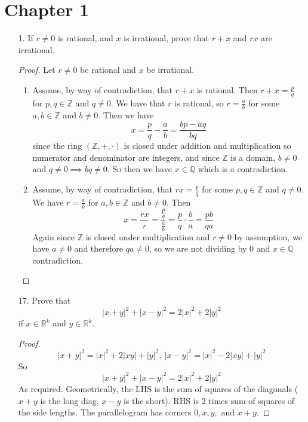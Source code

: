 \documentclass[hidelinks,12pt]{article}
\title{\scalebox{2}{Math 724 Homework 1}}
\author{\scalebox{1.5}{Theo Koss}}
\date{September 2024}
\newcommand{\R}{\mathbb{R}}
\newcommand{\Z}{\mathbb{Z}}
\newcommand{\Q}{\mathbb{Q}}
\begin{document}
\maketitle
\section{Chapter 1}
\begin{enumerate}
    \item[1.] If $r\neq0$ is rational, and $x$ is irrational, prove that $r+x$ and $rx$ are irrational.
        \begin{proof}
            Let $r\neq0$ be rational and $x$ be irrational.
            \begin{enumerate}[label=(\alph*)]
                \item Assume, by way of contradiction, that $r+x$ is rational. Then $r+x=\frac{p}{q}$ for $p,q\in\Z$ and $q\neq0$. We have that $r$ is rational, so $r=\frac{a}{b}$ for some $a,b\in\Z$ and $b\neq0$. Then we have \[x=\frac{p}{q}-\frac{a}{b}=\frac{bp-aq}{bq}\] since the ring $(\Z,+,\cdot)$ is closed under addition and multiplication so numerator and denominator are integers, and since $\Z$ is a domain, $b\neq0$ and $q\neq0\implies bq\neq0$. So then we have $x\in\Q$ which is a contradiction.
                \item Assume, by way of contradiction, that $rx=\frac{p}{q}$ for some $p,q\in\Z$ and $q\neq0$. We have $r=\frac{a}{b}$ for $a,b\in\Z$ and $b\neq0$. Then \[x=\frac{rx}{r}=\frac{\frac{p}{q}}{\frac{a}{b}}=\frac{p}{q}\cdot\frac{b}{a}=\frac{pb}{qa}\] Again since $\Z$ is closed under multiplication and $r\neq0$ by assumption, we have $a\neq0$ and therefore $qa\neq0$, so we are not dividing by 0 and $x\in\Q$ contradiction.
            \end{enumerate} 
        \end{proof}
    \item[17.] Prove that \[
        |x+y|^2+|x-y|^2=2|x|^2+2|y|^2 
    \]
    if $x\in\R^k$ and $y\in\R^k$.
    \begin{proof}
    \[
        |x+y|^2=|x|^2+2|xy|+|y|^2,\ |x-y|^2=|x|^2-2|xy|+|y|^2 \tag{By FOIL}
    \]
    So
    \[
        |x+y|^2+|x-y|^2=2|x|^2+2|y|^2
    \]
    As required. Geometrically, the LHS is the sum of squares of the diagonals ($x+y$ is the long diag, $x-y$ is the short). RHS is 2 times sum of squares of the side lengths. The parallelogram has corners $0,x,y,\text{ and }x+y$.
    \end{proof}
\end{enumerate}
\end{document}
